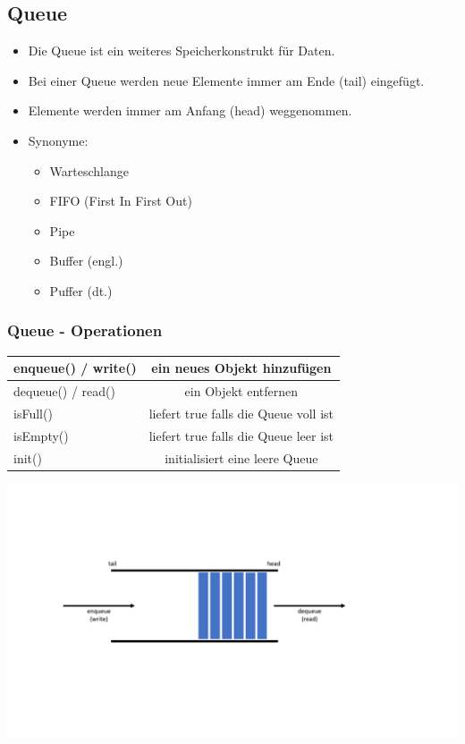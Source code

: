 \begin{multicols}{2}
\subsection{Queue}
\begin{itemize}
	\item Die Queue ist ein weiteres Speicherkonstrukt für Daten.
	\item Bei einer Queue werden neue Elemente immer am Ende (tail) eingefügt.
	\item Elemente werden immer am Anfang (head) weggenommen.
	\item Synonyme:
	\begin{itemize}
		\item Warteschlange
		\item FIFO (First In First Out)
		\item Pipe
		\item Buffer (engl.)
		\item Puffer (dt.)
	\end{itemize}
\end{itemize}
\vfill\null
\columnbreak
\subsubsection{Queue - Operationen}
\begin{tabular}{lc}
	enqueue() / write() & ein neues Objekt hinzufügen \\ 
	\hline 
	dequeue() / read() & ein Objekt entfernen \\ 
	\hline 
	isFull() & liefert true falls die Queue voll ist \\ 
	\hline 
	isEmpty() & liefert true falls die Queue leer ist \\ 
	init() & initialisiert eine leere Queue \\ 
\end{tabular}
\begin{minipage}{0.7\linewidth}
	\includegraphics[width=\linewidth]{images/klasse2.pdf}
\end{minipage}
\end{multicols}

